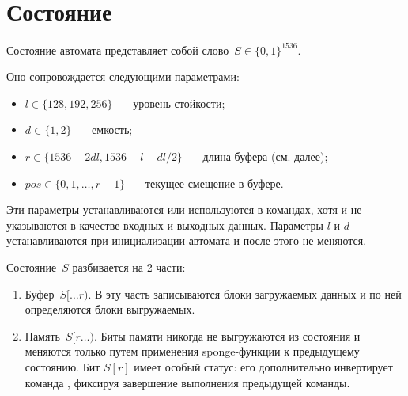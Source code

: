 \section{Состояние}\label{PRG.State}

Состояние автомата представляет собой слово~$S\in\{0,1\}^{1536}$. 

Оно сопровождается следующими параметрами:
\begin{itemize}
\item
$l\in\{128,192,256\}$~--- уровень стойкости;
\item
$d\in\{1,2\}$~--- емкость;
\item
$r\in\{1536-2dl,1536-l-dl/2\}$~--- длина буфера (см. далее);
\item
$pos\in\{0,1,\ldots,r-1\}$~--- текущее смещение в буфере.
\end{itemize}

Эти параметры устанавливаются или используются в командах, 
хотя и не указываются в качестве входных и выходных данных.
%
Параметры $l$ и $d$ устанавливаются при инициализации автомата и после этого 
не меняются.

Состояние~$S$ разбивается на 2 части: 
\begin{enumerate}
\item
Буфер~$S[\dots r)$.
В эту часть записываются блоки загружаемых данных и по ней определяются 
блоки выгружаемых.
\item
Память~$S[r\dots)$.
Биты памяти никогда не выгружаются из состояния и меняются только путем
применения sponge-функции к предыдущему состоянию.
%
Бит $S[r]$ имеет особый статус: его дополнительно 
инвертирует команда ,
фиксируя завершение выполнения предыдущей команды.
\end{enumerate}

